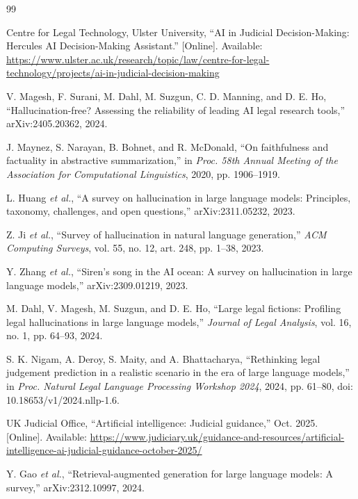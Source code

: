 \documentclass[conference]{IEEEtran}
\begin{document}
\vspace{-4pt}
\begin{thebibliography}{99}

Centre for Legal Technology, Ulster University, ``AI in Judicial Decision-Making: Hercules AI Decision-Making Assistant.'' [Online]. Available: \url{https://www.ulster.ac.uk/research/topic/law/centre-for-legal-technology/projects/ai-in-judicial-decision-making}

V. Magesh, F. Surani, M. Dahl, M. Suzgun, C. D. Manning, and D. E. Ho, ``Hallucination-free? Assessing the reliability of leading AI legal research tools,'' arXiv:2405.20362, 2024.

J. Maynez, S. Narayan, B. Bohnet, and R. McDonald, ``On faithfulness and factuality in abstractive summarization,'' in \textit{Proc. 58th Annual Meeting of the Association for Computational Linguistics}, 2020, pp. 1906--1919.

L. Huang \textit{et al.}, ``A survey on hallucination in large language models: Principles, taxonomy, challenges, and open questions,'' arXiv:2311.05232, 2023.

Z. Ji \textit{et al.}, ``Survey of hallucination in natural language generation,'' \textit{ACM Computing Surveys}, vol. 55, no. 12, art. 248, pp. 1--38, 2023.

Y. Zhang \textit{et al.}, ``Siren's song in the AI ocean: A survey on hallucination in large language models,'' arXiv:2309.01219, 2023.

M. Dahl, V. Magesh, M. Suzgun, and D. E. Ho, ``Large legal fictions: Profiling legal hallucinations in large language models,'' \textit{Journal of Legal Analysis}, vol. 16, no. 1, pp. 64--93, 2024.

S. K. Nigam, A. Deroy, S. Maity, and A. Bhattacharya, ``Rethinking legal judgement prediction in a realistic scenario in the era of large language models,'' in \textit{Proc. Natural Legal Language Processing Workshop 2024}, 2024, pp. 61--80, doi: 10.18653/v1/2024.nllp-1.6.

UK Judicial Office, ``Artificial intelligence: Judicial guidance,'' Oct. 2025. [Online]. Available: \url{https://www.judiciary.uk/guidance-and-resources/artificial-intelligence-ai-judicial-guidance-october-2025/}

Y. Gao \textit{et al.}, ``Retrieval-augmented generation for large language models: A survey,'' arXiv:2312.10997, 2024.


\end{thebibliography}
\end{document}
